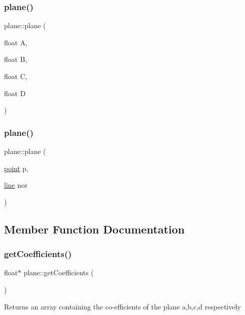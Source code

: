 \subsubsection{\texorpdfstring{plane()}{plane()}\hspace{0.1cm}{\footnotesize\ttfamily [1/2]}}
{\footnotesize\ttfamily plane\+::plane (\begin{DoxyParamCaption}\item[{float}]{A,  }\item[{float}]{B,  }\item[{float}]{C,  }\item[{float}]{D }\end{DoxyParamCaption})}

\mbox{\label{classplane_a63d7a83ca8a345da5ee6de3c67b8de0c}} 
\subsubsection{\texorpdfstring{plane()}{plane()}\hspace{0.1cm}{\footnotesize\ttfamily [2/2]}}
{\footnotesize\ttfamily plane\+::plane (\begin{DoxyParamCaption}\item[{\mbox{\hyperlink{classpoint}{point}}}]{p,  }\item[{\mbox{\hyperlink{classline}{line}}}]{nor }\end{DoxyParamCaption})}



\subsection{Member Function Documentation}
\mbox{\label{classplane_af4424e6ded2a9c57af4793aea84f56d2}} 
\subsubsection{\texorpdfstring{get\+Coefficients()}{getCoefficients()}}
{\footnotesize\ttfamily float$\ast$ plane\+::get\+Coefficients (\begin{DoxyParamCaption}{ }\end{DoxyParamCaption})}

Returns an array containing the co-\/efficients of the plane a,b,c,d respectively \mbox{\label{classplane_a4de93e2552aa7be05807f234dd02fbda}} 
